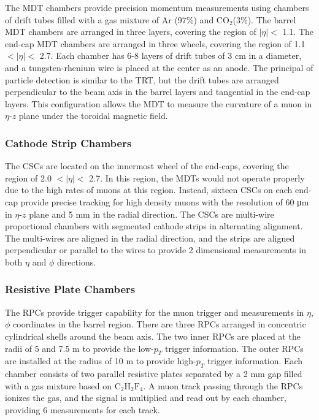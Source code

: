 The MDT chambers provide precision momentum measurements using chambers of drift tubes filled with a gas mixture of Ar (97\%) and $\mathrm{CO}_{2}$(3\%). The barrel MDT chambers are arranged in three layers, covering the region of $|\eta|<$ 1.1. The end-cap MDT chambers are arranged in three wheels, covering the region of 1.1 $<|\eta|<$ 2.7. Each chamber has 6-8 layers of drift tubes of 3 \si{\centi\meter} in a diameter, and a tungsten-rhenium wire is placed at the center as an anode. The principal of particle detection is similar to the TRT, but the drift tubes are arranged perpendicular to the beam axis in the barrel layers and tangential in the end-cap layers. This configuration allows the MDT to measure the curvature of a muon in $\eta$-$z$ plane under the toroidal magnetic field.

\subsubsection{Cathode Strip Chambers}
\label{sec:atlas:csc}

The CSCs are located on the innermost wheel of the end-caps, covering the region of 2.0 $<|\eta|<$ 2.7. In this region, the MDTs would not operate properly due to the high rates of muons at this region. Instead, sixteen CSCs on each end-cap provide precise tracking for high density muons with the resolution of 60 \si{\micro\meter} in $\eta$-$z$ plane and 5 \si{\milli\meter} in the radial direction. The CSCs are multi-wire proportional chambers with segmented cathode strips in alternating alignment. The multi-wires are aligned in the radial direction, and the strips are aligned perpendicular or parallel to the wires to provide 2 dimensional measurements in both $\eta$ and $\phi$ directions.


\subsubsection{Resistive Plate Chambers}
\label{sec:atlas:rpc}

The RPCs provide trigger capability for the muon trigger and measurements in $\eta$, $\phi$ coordinates in the barrel region. There are three RPCs arranged in concentric cylindrical shells around the beam axis. The two inner RPCs are placed at the radii of 5 and 7.5 \si{\meter} to provide the low-$p_{T}$ trigger information. The outer RPCs are installed at the radius of 10 \si{\meter} to provide high-$p_{T}$ trigger information. Each chamber consists of two parallel resistive plates separated by a 2 \si{\milli\meter} gap filled with a gas mixture based on $\mathrm{C}_{2}\mathrm{H}_{2}\mathrm{F}_{4}$. A muon track passing through the RPCs ionizes the gas, and the signal is multiplied and read out by each chamber, providing 6 measurements for each track.

